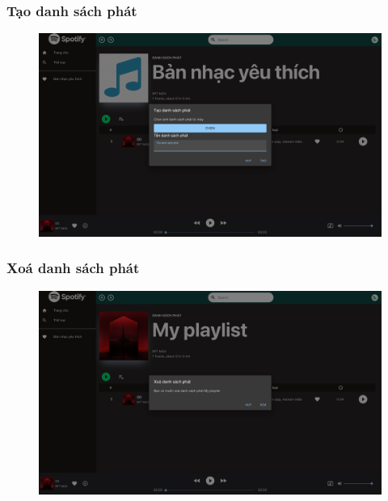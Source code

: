 \documentclass[a4paper]{article}
\begin{document}
\subsubsection{Tạo danh sách phát}
\begin{figure}[h!]
\begin{center}
\includegraphics[width=12cm]{playlist_create.png}
\end{center}
\end{figure}

\subsubsection{Xoá danh sách phát}
\begin{figure}[h!]
\begin{center}
\includegraphics[width=12cm]{playlist_delete.png}
\end{center}
\end{figure}
\newpage
\end{document}
